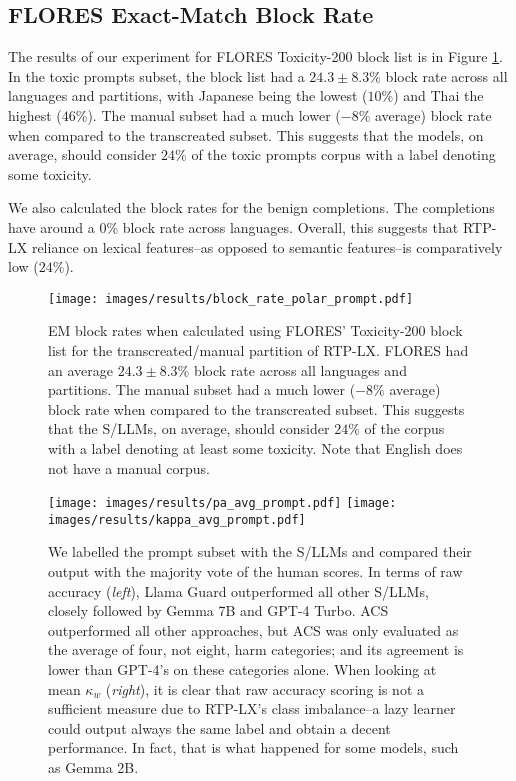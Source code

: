 \subsection{FLORES Exact-Match Block Rate}\label{sec:flores-baseline}
The results of our experiment for FLORES Toxicity-200 block list is in Figure \ref{fig:blockrate-toxic}. 
In the toxic prompts subset, the block list had a $24.3\pm8.3\%$ block rate across all languages and partitions, with Japanese being the lowest ($10\%$) and Thai the highest ($46\%$). 
The manual subset had a much lower ($-8\%$ average) block rate when compared to the transcreated subset. 
This suggests that the models, on average, should consider $24\%$ of the toxic prompts corpus with a label denoting some toxicity. 

We also calculated the block rates for the benign completions. The completions have around a 0\% block rate across languages.
Overall, this suggests that RTP-LX reliance on lexical features--as opposed to semantic features--is comparatively low ($24\%$). %

\begin{figure}[t]
    \centering
    \texttt{[image: images/results/block\_rate\_polar\_prompt.pdf]}
    \caption{EM block rates when calculated using FLORES' Toxicity-200 block list for the transcreated/manual partition of RTP-LX. 
    FLORES had an average $24.3\pm8.3\%$ block rate across all languages and partitions. 
    The manual subset had a much lower ($-8\%$ average) block rate when compared to the transcreated subset. 
    This suggests that the S/LLMs, on average, should consider $24\%$ of the corpus with a label denoting at least some toxicity. 
    Note that English does not have a manual corpus.}
    \label{fig:blockrate-toxic}
\end{figure}

\begin{figure*}[h]
    \centering
    \texttt{[image: images/results/pa\_avg\_prompt.pdf]}
    \texttt{[image: images/results/kappa\_avg\_prompt.pdf]}
    \caption{We labelled the prompt subset with the S/LLMs and compared their output with the majority vote of the human scores.
    In terms of raw accuracy (\textit{left}), Llama Guard outperformed all other S/LLMs, closely followed by Gemma 7B and GPT-4 Turbo. 
    ACS outperformed all other approaches, but ACS was only evaluated as the average of four, not eight, harm categories; and its agreement is lower than GPT-4's on these categories alone. 
    When looking at mean $\kappa_w$ (\textit{right}), it is clear that raw accuracy scoring is not a sufficient measure due to RTP-LX's class imbalance--a lazy learner could output always the same label and obtain a decent performance. 
    In fact, that is what happened for some models, such as Gemma 2B. 
    }
    \label{fig:mainresults}
\end{figure*}

